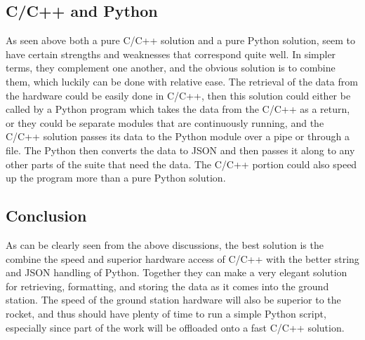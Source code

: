 \documentclass[onecolumn, draftclsnofoot,10pt, compsoc]{IEEEtran}
\begin{document}
\subsection{C/C++ and Python}
As seen above both a pure C/C++ solution and a pure Python solution, seem to have certain strengths and weaknesses that correspond quite well. In simpler terms, they complement one another, and the obvious solution is to combine them, which luckily can be done with relative ease. The retrieval of the data from the hardware could be easily done in C/C++, then this solution could either be called by a Python program which takes the data from the C/C++ as a return, or they could be separate modules that are continuously running, and the C/C++ solution passes its data to the Python module over a pipe or through a file. The Python then converts the data to JSON and then passes it along to any other parts of the suite that need the data. The C/C++ portion could also speed up the program more than a pure Python solution.
\subsection{Conclusion}
As can be clearly seen from the above discussions, the best solution is the combine the speed and superior hardware access of C/C++ with the better string and JSON handling of Python. Together they can make a very elegant solution for retrieving, formatting, and storing the data as it comes into the ground station. The speed of the ground station hardware will also be superior to the rocket, and thus should have plenty of time to run a simple Python script, especially since part of the work will be offloaded onto a fast C/C++ solution\cite{refgs}.  



\end{document}
